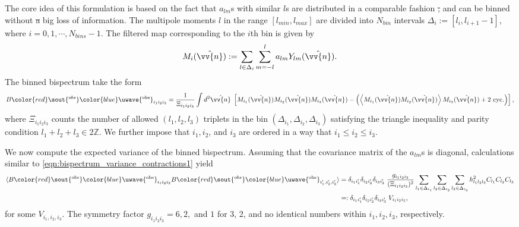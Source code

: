 \documentclass[a4paper,12pt,times,custombib,print,index]{Classes/PhDThesisPSnPDF} %
\providecommand{\DIFadd}[1]{{\protect\color{blue}\uwave{#1}}} %
\providecommand{\DIFdel}[1]{{\protect\color{red}\sout{#1}}}                      %
\providecommand{\DIFaddbegin}{} %
\providecommand{\DIFaddend}{} %
\providecommand{\DIFdelbegin}{} %
\providecommand{\DIFdelend}{} %
\newcommand{\DIFscaledelfig}{0.5}
\newlength{\DIFdelgraphicswidth} %
\newlength{\DIFdelgraphicsheight} %
\newcommand{\DIFaddincludegraphics}[2][]{{\color{blue}\fbox{\DIFOincludegraphics[#1]{#2}}}} %
\newcommand{\DIFdelincludegraphics}[2][]{%
\sbox{\DIFdelgraphicsbox}{\DIFOincludegraphics[#1]{#2}}%
\settoboxwidth{\DIFdelgraphicswidth}{\DIFdelgraphicsbox} %
\settoboxtotalheight{\DIFdelgraphicsheight}{\DIFdelgraphicsbox} %
\scalebox{\DIFscaledelfig}{%
\parbox[b]{\DIFdelgraphicswidth}{\usebox{\DIFdelgraphicsbox}\\[-\baselineskip] \rule{\DIFdelgraphicswidth}{0em}}\llap{\resizebox{\DIFdelgraphicswidth}{\DIFdelgraphicsheight}{%
\setlength{\unitlength}{\DIFdelgraphicswidth}%
\begin{picture}(1,1)%
\thicklines\linethickness{2pt} %
{\color[rgb]{1,0,0}\put(0,0){\framebox(1,1){}}}%
{\color[rgb]{1,0,0}\put(0,0){\line( 1,1){1}}}%
{\color[rgb]{1,0,0}\put(0,1){\line(1,-1){1}}}%
\end{picture}%
}\hspace*{3pt}}} %
} %
\DeclareRobustCommand{\DIFaddbegin}{\DIFOaddbegin \let\includegraphics\DIFaddincludegraphics} %
\DeclareRobustCommand{\DIFaddend}{\DIFOaddend \let\includegraphics\DIFOincludegraphics} %
\DeclareRobustCommand{\DIFdelbegin}{\DIFOdelbegin \let\includegraphics\DIFdelincludegraphics} %
\DeclareRobustCommand{\DIFdelend}{\DIFOaddend \let\includegraphics\DIFOincludegraphics} %
\begin{document}
The core idea of this formulation is based on the fact that $a_{lm}$s with similar $l$s are distributed in a comparable fashion \DIFdelbegin \DIFdel{, }\DIFdelend and can be binned without \DIFdelbegin \DIFdel{a }\DIFdelend big loss of information. The multipole moments $l$ in the range \DIFdelbegin \DIFdel{$[l_{min},l_{max}]$ }\DIFdelend \DIFaddbegin \DIFadd{$[l_\text{min},l_\text{max}]$ }\DIFaddend are divided into \DIFdelbegin \DIFdel{$N_{bin}$ }\DIFdelend \DIFaddbegin \DIFadd{$N_\text{bin}$ }\DIFaddend intervals $\Delta_i := [l_i,l_{i+1}-1]$, where \DIFdelbegin \DIFdel{$i=0,1,\cdots,N_{bins}-1$}\DIFdelend \DIFaddbegin \DIFadd{$i=0,1,\cdots,N_\text{bin}-1$}\DIFaddend .  The filtered map corresponding to the $i$th bin is given by
\begin{align}
		M_i(\hat{\vv{n}}) := \sum_{l\in\Delta_i}\sum_{m=-l}^{l} a_{lm} Y_{lm}(\hat{\vv{n}}).
\end{align}
The binned bispectrum take the form
\begin{align}
	B\DIFdelbegin \DIFdel{^{obs}}\DIFdelend \DIFaddbegin \DIFadd{^\text{obs}}\DIFaddend _{i_1 i_2 i_3} = \frac{1}{\Xi_{i_1 i_2 i_3}} \int d^2 \hat{\vv{n}} \; \left[ M_{i_1} (\hat{\vv{n}}) M_{i_2} (\hat{\vv{n}}) M_{i_3} (\hat{\vv{n}}) - \left( \left< M_{i_1} (\hat{\vv{n}}) M_{i_2} (\hat{\vv{n}}) \right> M_{i_3} (\hat{\vv{n}}) + \text{2 cyc.}\right)  \right],
\end{align}
where $\Xi_{i_1 i_2 i_3}$ counts the number of allowed $(l_1,l_2,l_3)$ triplets in the bin $(\Delta_{i_1},\Delta_{i_2},\Delta_{i_3})$ satisfying the triangle inequality and parity condition $l_1+l_2+l_3 \in 2\mathbb{Z}$. We further impose that $i_1,i_2$, and $i_3$ are ordered in a way that $i_1 \le i_2 \le i_3$.

We now compute the expected variance of the binned bispectrum. Assuming that the covariance matrix of the $a_{lm}$s is diagonal, calculations similar to \eqref{eqn:bispectrum_variance_contractions1} yield
\begin{align}
	\langle B\DIFdelbegin \DIFdel{^{obs}}\DIFdelend \DIFaddbegin \DIFadd{^\text{obs}}\DIFaddend _{i_1 i_2 i_3} B\DIFdelbegin \DIFdel{^{obs}}\DIFdelend \DIFaddbegin \DIFadd{^\text{obs}}\DIFaddend _{i'_1,i'_2,i'_3} \rangle &=  \delta_{i_1 i'_1} \delta_{i_2 i'_2} \delta_{i_3 i'_3} \; \frac{g_{i_1 i_2 i_3}}{(\Xi_{i_1 i_2 i_3})^2} \sum_{l_1 \in \Delta_{i_1}} \sum_{l_2 \in \Delta_{i_2}} \sum_{l_3 \in \Delta_{i_3}} h^2_{l_1 l_2 l_3} C_{l_1} C_{l_2} C_{l_3} \\
	&=: \delta_{i_1 i'_1} \delta_{i_2 i'_2} \delta_{i_3 i'_3} \; V_{i_1 i_2 i_3},
\end{align}
for some $V_{i_1,i_2,i_3}$. The symmetry factor $g_{i_1 i_2 i_3}=6,2,$ and $1$ for 3, 2, and no identical numbers within $i_1,i_2,i_3$, respectively.
\end{document}
